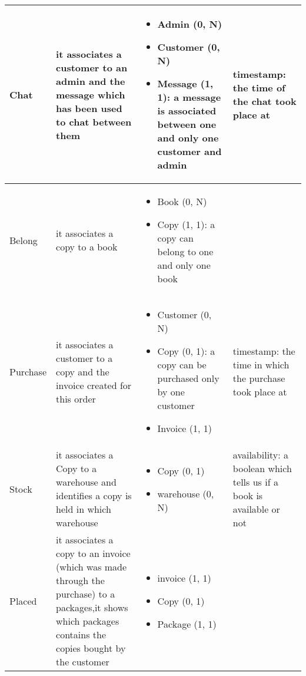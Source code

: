 \begin{longtable}{|p{}|p{} |p{}|p{} |}
  Chat & it associates a customer to an admin and the message which has been used to chat between them & \begin{itemize}
        \vspace{-1em}
        \item Admin (0, N)
        \item Customer (0, N)
        \item Message (1, 1): a message is associated between one and only one customer and admin
    \end{itemize}
 &  timestamp: the time of the chat took place at \\\hline
 
  Belong & it associates a copy to a book & \begin{itemize}
        \vspace{-1em}
        \item Book (0, N)
        \item Copy (1, 1): a copy can belong to one and only one book
    \end{itemize}
 &   \\\hline
 
  Purchase & it associates a customer to a copy and the invoice created for this order & \begin{itemize}
        \vspace{-1em}
        \item Customer (0, N)
        \item Copy (0, 1): a copy can be purchased only by one customer
        \item Invoice (1, 1)
    \end{itemize}
 &  timestamp: the time in which the purchase took place at \\\hline
 
  Stock & it associates a Copy to a warehouse and identifies a copy is held in which warehouse & \begin{itemize}
        \vspace{-1em}
        \item Copy (0, 1)
        \item warehouse (0, N)
    \end{itemize}
 &  availability: a boolean which tells us if a book is available or not \\\hline
 
  Placed & it associates a copy to an invoice (which was made through the purchase) to a packages,it shows which packages contains the copies bought by the customer & \begin{itemize}
        \vspace{-1em}
        \item invoice (1, 1)
        \item Copy (0, 1)
        \item Package (1, 1)
        


\end{itemize}
\end{longtable}
